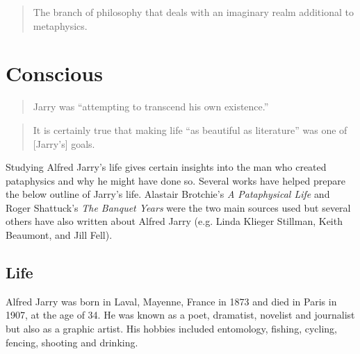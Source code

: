 \begin{quotation}
  The branch of philosophy that deals with an imaginary realm additional to metaphysics. 
\end{quotation}


\section{Conscious}

\begin{quotation}
  Jarry was ``attempting to transcend his own existence.'' 
\end{quotation}

\begin{quotation}
  It is certainly true that making life ``as beautiful as literature'' was one of [Jarry's] goals. 
\end{quotation}

Studying Alfred Jarry's life gives certain insights into the man who created pataphysics and why he might have done so. Several works have helped prepare the below outline of Jarry's life. Alastair Brotchie's \textit{A Pataphysical Life} \autocite*{Brotchie2011a} and Roger Shattuck's \textit{The Banquet Years} \autocite*{Shattuck1959} were the two main sources used but several others have also written about Alfred Jarry (e.g. Linda Klieger Stillman, Keith Beaumont, and Jill Fell).


\subsection{Life}

Alfred Jarry was born in Laval, Mayenne, France in 1873 and died in Paris in 1907, at the age of 34. He was known as a poet, dramatist, novelist and journalist but also as a graphic artist. His hobbies included entomology, fishing, cycling, fencing, shooting and drinking.


